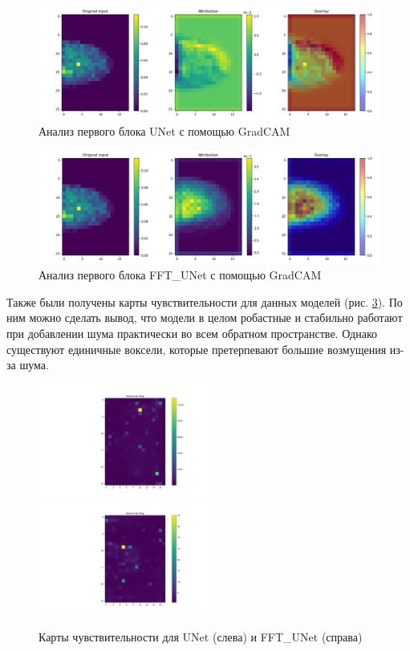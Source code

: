 \begin{figure}[H]
    \centering
    \includegraphics[width=1\textwidth]{figures/attribution_overlay.png}
    \caption{Анализ первого блока UNet с помощью GradCAM}
    \label{gradU}
\end{figure}

\begin{figure}[H]
    \centering
    \includegraphics[width=1\textwidth]{figures/attribution_overlay_fft.png}
    \caption{Анализ первого блока FFT\_UNet с помощью GradCAM}
    \label{gradFFT}
\end{figure}

Также были получены карты чувствительности для данных моделей (рис. \ref{sens}). По ним можно сделать вывод, что модели в целом робастные и стабильно работают при добавлении шума практически во всем обратном пространстве. Однако существуют единичные воксели, которые претерпевают большие возмущения из-за шума. 


\begin{figure}[H]
    \centering
    \includegraphics[width=0.5\textwidth]{figures/sensitivity_map.png}\hfill
    \includegraphics[width=0.5\textwidth]{figures/sensitivity_map_fft.png}
    \caption{Карты чувствительности для UNet (слева) и FFT\_UNet (справа)}
    \label{sens}
\end{figure}





